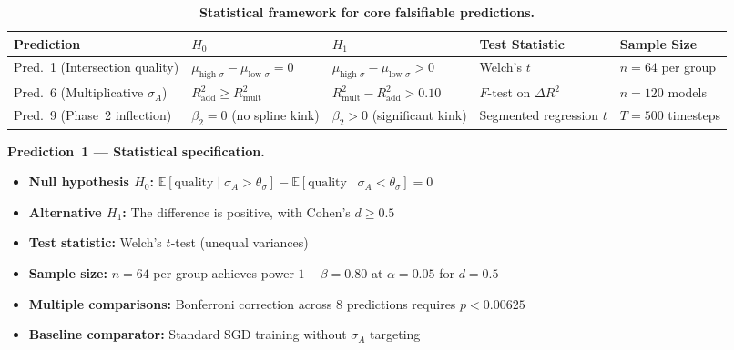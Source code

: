 \documentclass[11pt]{article}
\theoremstyle{definition}
\theoremstyle{plain}
\begin{document}
\begin{table}[htbp]
\centering
\caption{\textbf{Statistical framework for core falsifiable predictions.}}
\label{tab:predictions-framework}
\small
\begin{tabular}{@{}l p{2.2cm} p{2.2cm} p{2.5cm} p{2.0cm}@{}}
\toprule
\textbf{Prediction} & \textbf{$H_0$} & \textbf{$H_1$} & \textbf{Test Statistic} & \textbf{Sample Size} \\
\midrule
Pred.~1 (Intersection quality) & $\mu_{\text{high-}\sigma} - \mu_{\text{low-}\sigma} = 0$ & $\mu_{\text{high-}\sigma} - \mu_{\text{low-}\sigma} > 0$ & Welch's $t$ & $n = 64$ per group \\
Pred.~6 (Multiplicative $\sigma_A$) & $R^2_{\text{add}} \geq R^2_{\text{mult}}$ & $R^2_{\text{mult}} - R^2_{\text{add}} > 0.10$ & $F$-test on $\Delta R^2$ & $n = 120$ models \\
Pred.~9 (Phase~2 inflection) & $\beta_2 = 0$ (no spline kink) & $\beta_2 > 0$ (significant kink) & Segmented regression $t$ & $T = 500$ timesteps \\
\bottomrule
\end{tabular}
\end{table}

\textbf{Prediction~1 --- Statistical specification.}
\begin{itemize}[nosep]
\item \textbf{Null hypothesis $H_0$:} $\mathbb{E}[\text{quality} \mid \sigma_A > \theta_\sigma] - \mathbb{E}[\text{quality} \mid \sigma_A < \theta_\sigma] = 0$
\item \textbf{Alternative $H_1$:} The difference is positive, with Cohen's $d \geq 0.5$
\item \textbf{Test statistic:} Welch's $t$-test (unequal variances)
\item \textbf{Sample size:} $n = 64$ per group achieves power $1 - \beta = 0.80$ at $\alpha = 0.05$ for $d = 0.5$
\item \textbf{Multiple comparisons:} Bonferroni correction across 8 predictions requires $p < 0.00625$
\item \textbf{Baseline comparator:} Standard SGD training without $\sigma_A$ targeting
\end{itemize}
\end{document}
